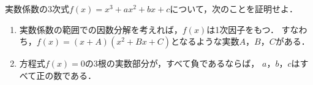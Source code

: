 \documentclass[../../main.tex]{subfiles}
\begin{document}
実数係数の3次式$f(x)=x^3+ax^2+bx+c$について，次のことを証明せよ．
\begin{enumerate}
  \item 実数係数の範囲での因数分解を考えれば，$f(x)$は1次因子をもつ．
    すなわち，$f(x)=(x+A)(x^2+Bx+C)$となるような実数$A$，$B$，$C$がある．
  \item 方程式$f(x)=0$の3根の実数部分が，すべて負であるならば，
    $a$，$b$，$c$はすべて正の数である．
\end{enumerate}
\end{document}
